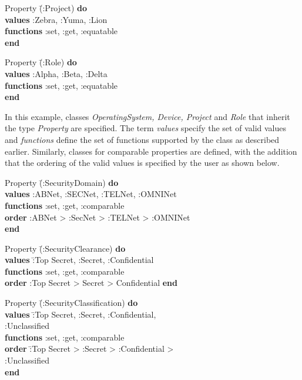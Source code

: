 \begin{tabbing}
Property \= (:Project) {\bf do} \\
\>	 {\bf values}  :Zebra, :Yuma, :Lion\\
\>	 {\bf functions} :set, :get, :equatable \\
	 {\bf end}
\end{tabbing}

\begin{tabbing}	
 Property  \= (:Role) {\bf do} \\
\>	 {\bf values} :Alpha, :Beta, :Delta\\
\>	 {\bf functions}  :set, :get, :equatable \\
	 {\bf end}
\end{tabbing}
	
In this example, classes  {\em OperatingSystem, Device, Project} and {\em Role} that inherit the type {\em Property} are specified. The term {\em values} specify the set of valid values and {\em functions} define the set of functions supported by the class as described earlier. Similarly, classes for comparable properties are defined, with the addition that the ordering of the valid values is specified by the user as shown below. 

\begin{tabbing}
             Property \= (:SecurityDomain) {\bf do} \\
\>	   {\bf values}  :ABNet, :SECNet, :TELNet, :OMNINet\\
\>	   {\bf functions}   :set, :get, :comparable \\
\>	   {\bf order} :ABNet > :SecNet > :TELNet > :OMNINet\\
	{\bf end} 
\end{tabbing}
	
\begin{tabbing}
 Property \= (:SecurityClearance) {\bf do} \\
\>	 {\bf values} \= :Top Secret, :Secret, :Confidential \\
\>	 {\bf functions}  :set, :get, :comparable \\
\>       {\bf order} :Top Secret > Secret > Confidential
	 {\bf end}
\end{tabbing}

\begin{tabbing}
Property \= (:SecurityClassification) {\bf do} \\
\>	 {\bf values} \=  :Top Secret, :Secret, :Confidential, \\
\>\>                               :Unclassified\\
\>	 {\bf functions} :set, :get, :comparable \\
\>       {\bf order} \= :Top Secret > :Secret > :Confidential > \\
\>\>                           :Unclassified\\
	 {\bf end}
\end{tabbing}


